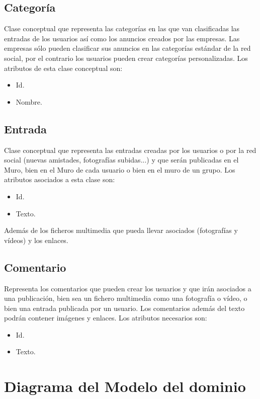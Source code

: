 \documentclass[12pt, a4paper, titlepage]{article}
\begin{document}
\subsection{Categoría}
	Clase conceptual que representa las categorías en las que van clasificadas las entradas de los usuarios así como los anuncios creados por las empresas. Las empresas sólo pueden clasificar sus anuncios en las categorías estándar de la red social, por el contrario los usuarios pueden crear categorías personalizadas.
	Los atributos de esta clase conceptual son:
	\begin{itemize}
		\item Id.
		\item Nombre.
	\end{itemize}
\subsection{Entrada}
	Clase conceptual que representa las entradas creadas por los usuarios o por la red social (nuevas amistades, fotografías subidas...) y que serán publicadas en el Muro, bien en el Muro de cada usuario o bien en el muro de un grupo. 
	Los atributos asociados a esta clase son:
	\begin{itemize}
		\item Id.
		\item Texto.
	\end{itemize}
	Además de los ficheros multimedia que pueda llevar asociados (fotografías y vídeos) y los enlaces.
\subsection{Comentario}
	Representa los comentarios que pueden crear los usuarios y que irán asociados a una publicación, bien sea un fichero multimedia como una fotografía o vídeo, o bien una entrada publicada por un usuario. Los comentarios además del texto podrán contener imágenes y enlaces.
	Los atributos necesarios son:
	\begin{itemize}
		\item Id.
		\item Texto.
	\end{itemize}


\section{Diagrama del Modelo del dominio}

\end{document}

